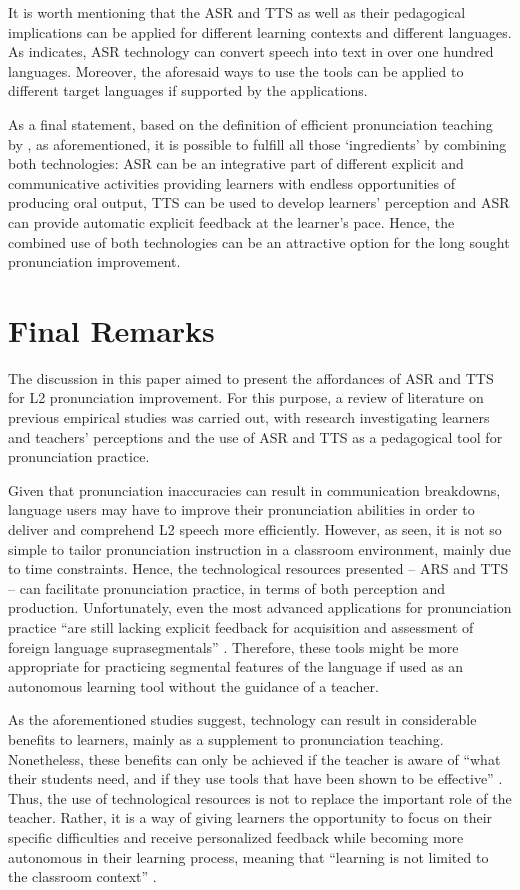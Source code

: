 \documentclass[english]{textolivre}
\begin{document}
It is worth mentioning that the ASR and TTS as well as their pedagogical implications can be applied for different learning contexts and different languages. As \textcite{henrichsen2021} indicates, ASR technology can convert speech into text in over one hundred languages. Moreover, the aforesaid ways to use the tools can be applied to different target languages if supported by the applications.

As a final statement, based on the definition of efficient pronunciation teaching by \textcite{darcy2018}, as aforementioned, it is possible to fulfill all those ‘ingredients’ by combining both technologies: ASR can be an integrative part of different explicit and communicative activities providing learners with endless opportunities of producing oral output, TTS can be used to develop learners' perception and ASR can provide automatic explicit feedback at the learner’s pace. Hence, the combined use of both technologies can be an attractive option for the long sought pronunciation improvement.

\section{Final Remarks}
The discussion in this paper aimed to present the affordances of ASR and TTS for L2 pronunciation improvement. For this purpose, a review of literature on previous empirical studies was carried out, with research investigating learners and teachers’ perceptions and the use of ASR and TTS as a pedagogical tool for pronunciation practice.

Given that pronunciation inaccuracies can result in communication breakdowns, language users may have to improve their pronunciation abilities in order to deliver and comprehend L2 speech more efficiently. However, as seen, it is not so simple to tailor pronunciation instruction in a classroom environment, mainly due to time constraints. Hence, the technological resources presented – ARS and TTS – can facilitate pronunciation practice, in terms of both perception and production. Unfortunately, even the most advanced applications for pronunciation practice “are still lacking explicit feedback for acquisition and assessment of foreign language suprasegmentals” \cite[p. 3]{bogach2021}. Therefore, these tools might be more appropriate for practicing segmental features of the language if used as an autonomous learning tool without the guidance of a teacher.

As the aforementioned studies suggest, technology can result in considerable benefits to learners, mainly as a supplement to pronunciation teaching. Nonetheless, these benefits can only be achieved if the teacher is aware of “what their students need, and if they use tools that have been shown to be effective” \cite[p. 326]{darcy2018}. Thus, the use of technological resources is not to replace the important role of the teacher. Rather, it is a way of giving learners the opportunity to focus on their specific difficulties and receive personalized feedback while becoming more autonomous in their learning process, meaning that “learning is not limited to the classroom context” \cite[p. 104]{carlet_improving_2018}.
\end{document}
